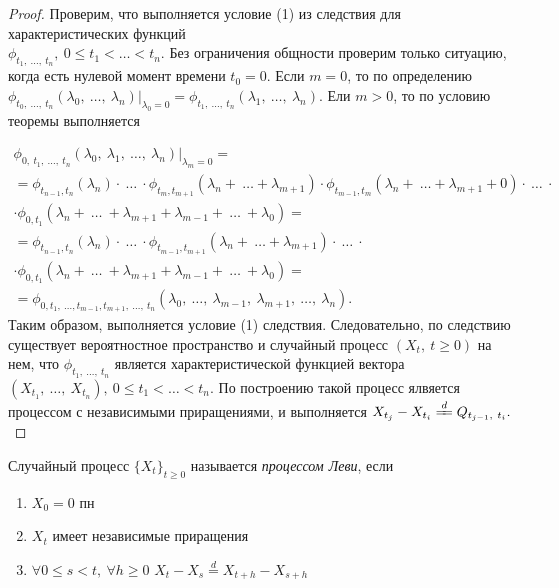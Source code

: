 \begin{proof}
Проверим, что выполняется условие (1) из следствия для характеристических функций\\ $\displaystyle \phi _{t_{1} ,\ \dotsc ,\ t_{n}} ,\ 0\leqslant t_{1} < \dotsc < t_{n}$. Без ограничения общности проверим только ситуацию, когда есть нулевой момент времени $\displaystyle t_{0} =0$. Если $\displaystyle m=0$, то по определению $\displaystyle \phi _{t_{0} ,\ \dotsc ,\ t_{n}}( \lambda _{0} ,\ \dotsc ,\ \lambda _{n}) \big\rvert_{\lambda _{0} =0} =\phi _{t_{1} ,\ \dotsc ,\ t_{n}}( \lambda _{1} ,\ \dotsc ,\ \lambda _{n})$. Ели $\displaystyle m >0$, то по условию теоремы выполняется

\begin{gather*}
\phi _{0,\ t_{1} ,\ \dotsc ,\ t_{n}}( \lambda _{0} ,\ \lambda _{1} ,\ \dotsc ,\ \lambda _{n}) \big\rvert_{\lambda _{m} =0} =\\
=\phi _{t_{n-1} ,t_{n}}( \lambda _{n}) \cdotp \ \dotsc \ \cdotp \phi _{t_{m} ,t_{m+1}}( \lambda _{n} +\ \dotsc +\lambda _{m+1}) \cdotp \phi _{t_{m-1} ,t_{m}}( \lambda _{n} +\ \dotsc +\lambda _{m+1} +0) \cdotp \ \dotsc \ \cdotp \\
\cdotp \phi _{0,t_{1}}( \lambda _{n} +\ \dotsc \ +\lambda _{m+1} +\lambda _{m-1} +\ \dotsc \ +\lambda _{0}) =\\
=\phi _{t_{n-1} ,t_{n}}( \lambda _{n}) \cdotp \ \dotsc \ \cdotp \phi _{t_{m-1} ,t_{m+1}}( \lambda _{n} +\ \dotsc +\lambda _{m+1}) \cdotp \ \dotsc \ \cdotp \\
\cdotp \phi _{0,t_{1}}( \lambda _{n} +\ \dotsc \ +\lambda _{m+1} +\lambda _{m-1} +\ \dotsc \ +\lambda _{0}) =\\
=\phi _{0,t_{1} ,\ \dotsc ,t_{m-1} ,t_{m+1} ,\ \dotsc ,\ t_{n}}( \lambda _{0} ,\ \dotsc ,\ \lambda _{m-1} ,\ \lambda _{m+1} ,\ \dotsc ,\ \lambda _{n}) .
\end{gather*}
Таким образом, выполняется условие (1) следствия. Следовательно, по следствию существует вероятностное пространство и случайный процесс $\displaystyle ( X_{t} ,\ t\geqslant 0)$ на нем, что $\displaystyle \phi _{t_{1} ,\ \dotsc ,\ t_{n}}$ является характеристической функцией вектора $\displaystyle ( X_{t_{1}} ,\ \dotsc ,\ X_{t_{n}}) ,\ 0\leqslant t_{1} < \dotsc < t_{n}$. По построению такой процесс ялвяется процессом с независимыми приращениями, и выполняется $\displaystyle X_{t_{j}} -X_{t_{i}}\xlongequal{d} Q_{t_{j-1} ,\ t_{i}} .$
\end{proof}
\begin{definition}
     Случайный процесс $\{X_t\}_{t \geq 0}$ называется \textit{процессом Леви}, если
\begin{enumerate}
    \item $X_0 = 0$ пн
    \item $X_t$ имеет независимые приращения
    \item $\forall 0 \leq s < t, \ \forall h \geq 0$ $X_t - X_s \overset{d}{=} X_{t+h} - X_{s+h}$
\end{enumerate}
\end{definition}